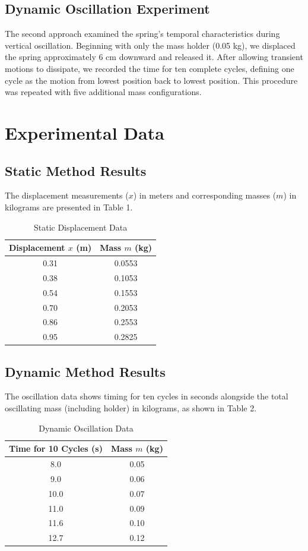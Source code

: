 \documentclass[12pt]{article}
\begin{document}
\subsection*{Dynamic Oscillation Experiment}

The second approach examined the spring's temporal characteristics during vertical oscillation. Beginning with only the mass holder (0.05 kg), we displaced the spring approximately 6 cm downward and released it. After allowing transient motions to dissipate, we recorded the time for ten complete cycles, defining one cycle as the motion from lowest position back to lowest position. This procedure was repeated with five additional mass configurations.

\section*{Experimental Data}

\subsection*{Static Method Results}

The displacement measurements ($x$) in meters and corresponding masses ($m$) in kilograms are presented in Table 1.

\begin{table}[H]
\centering
\caption{Static Displacement Data}
\begin{tabular}{cc}
\toprule
Displacement $x$ (m) & Mass $m$ (kg) \\
\midrule
0.31 & 0.0553 \\
0.38 & 0.1053 \\
0.54 & 0.1553 \\
0.70 & 0.2053 \\
0.86 & 0.2553 \\
0.95 & 0.2825 \\
\bottomrule
\end{tabular}
\label{tab:static}
\end{table}

\subsection*{Dynamic Method Results}

The oscillation data shows timing for ten cycles in seconds alongside the total oscillating mass (including holder) in kilograms, as shown in Table 2.

\begin{table}[H]
\centering
\caption{Dynamic Oscillation Data}
\begin{tabular}{cc}
\toprule
Time for 10 Cycles (s) & Mass $m$ (kg) \\
\midrule
8.0 & 0.05 \\
9.0 & 0.06 \\
10.0 & 0.07 \\
11.0 & 0.09 \\
11.6 & 0.10 \\
12.7 & 0.12 \\
\bottomrule
\end{tabular}
\label{tab:dynamic}
\end{table}
\end{document}
